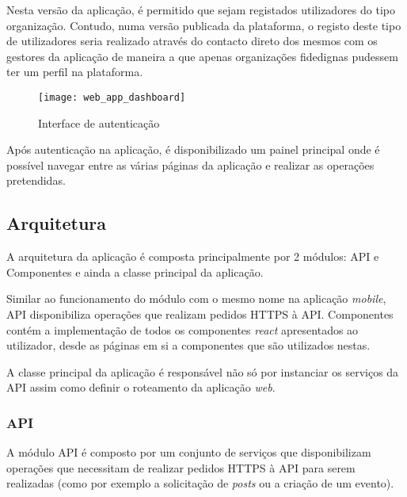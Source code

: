 Nesta versão da aplicação, é permitido que sejam registados utilizadores do tipo organização. Contudo, numa versão publicada da plataforma, o registo deste tipo de utilizadores seria realizado através do contacto direto dos mesmos com os gestores da aplicação de maneira a que apenas organizações fidedignas pudessem ter um perfil na plataforma.

\par \medskip

\begin{figure}[h]
	\centering
	\texttt{[image: web\_app\_dashboard]}
	\caption{Interface de autenticação}
\end{figure}

Após autenticação na aplicação, é disponibilizado um painel principal onde é possível navegar entre as várias páginas da aplicação e realizar as operações pretendidas.

\par \medskip

\subsection{Arquitetura}

A arquitetura da aplicação é composta principalmente por 2 módulos: API e Componentes e ainda a classe principal da aplicação.

\par \medskip 

Similar ao funcionamento do módulo com o mesmo nome na aplicação \textit{mobile}, API disponibiliza operações que realizam pedidos HTTPS à API. Componentes contém a implementação de todos os componentes \textit{react} apresentados ao utilizador, desde as páginas em si a componentes que são utilizados nestas. 

\par \medskip

A classe principal da aplicação é responsável não só por instanciar os serviços da API assim como definir o roteamento da aplicação \textit{web}.

\subsubsection{API}

A módulo API é composto por um conjunto de serviços que disponibilizam operações que necessitam de realizar pedidos HTTPS à API para serem realizadas (como por exemplo a solicitação de \textit{posts} ou a criação de um evento).

